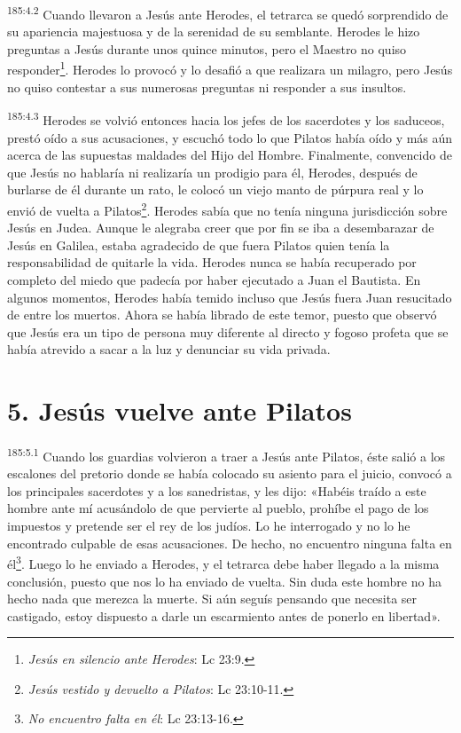 \par 
\textsuperscript{185:4.2} Cuando llevaron a Jesús ante Herodes, el tetrarca se quedó sorprendido de su apariencia majestuosa y de la serenidad de su semblante. Herodes le hizo preguntas a Jesús durante unos quince minutos, pero el Maestro no quiso responder\footnote{\textit{Jesús en silencio ante Herodes}: Lc 23:9.}. Herodes lo provocó y lo desafió a que realizara un milagro, pero Jesús no quiso contestar a sus numerosas preguntas ni responder a sus insultos.

\par 
\textsuperscript{185:4.3} Herodes se volvió entonces hacia los jefes de los sacerdotes y los saduceos, prestó oído a sus acusaciones, y escuchó todo lo que Pilatos había oído y más aún acerca de las supuestas maldades del Hijo del Hombre. Finalmente, convencido de que Jesús no hablaría ni realizaría un prodigio para él, Herodes, después de burlarse de él durante un rato, le colocó un viejo manto de púrpura real y lo envió de vuelta a Pilatos\footnote{\textit{Jesús vestido y devuelto a Pilatos}: Lc 23:10-11.}. Herodes sabía que no tenía ninguna jurisdicción sobre Jesús en Judea. Aunque le alegraba creer que por fin se iba a desembarazar de Jesús en Galilea, estaba agradecido de que fuera Pilatos quien tenía la responsabilidad de quitarle la vida. Herodes nunca se había recuperado por completo del miedo que padecía por haber ejecutado a Juan el Bautista. En algunos momentos, Herodes había temido incluso que Jesús fuera Juan resucitado de entre los muertos. Ahora se había librado de este temor, puesto que observó que Jesús era un tipo de persona muy diferente al directo y fogoso profeta que se había atrevido a sacar a la luz y denunciar su vida privada.

\section*{5. Jesús vuelve ante Pilatos}
\par 
\textsuperscript{185:5.1} Cuando los guardias volvieron a traer a Jesús ante Pilatos, éste salió a los escalones del pretorio donde se había colocado su asiento para el juicio, convocó a los principales sacerdotes y a los sanedristas, y les dijo: «Habéis traído a este hombre ante mí acusándolo de que pervierte al pueblo, prohíbe el pago de los impuestos y pretende ser el rey de los judíos. Lo he interrogado y no lo he encontrado culpable de esas acusaciones. De hecho, no encuentro ninguna falta en él\footnote{\textit{No encuentro falta en él}: Lc 23:13-16.}. Luego lo he enviado a Herodes, y el tetrarca debe haber llegado a la misma conclusión, puesto que nos lo ha enviado de vuelta. Sin duda este hombre no ha hecho nada que merezca la muerte. Si aún seguís pensando que necesita ser castigado, estoy dispuesto a darle un escarmiento antes de ponerlo en libertad».

